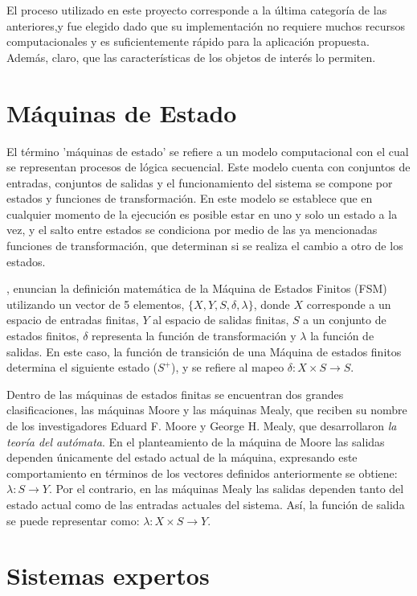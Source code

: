 El proceso utilizado en este proyecto corresponde a la última categoría de las anteriores,y fue elegido dado que su implementación no requiere muchos recursos computacionales y es suficientemente rápido para la aplicación propuesta. Además, claro, que las características de los objetos de interés lo permiten.


\section{Máquinas de Estado}

El término 'máquinas de estado' se refiere a un modelo computacional con el cual se representan procesos de lógica secuencial. Este modelo cuenta con conjuntos de entradas, conjuntos de salidas y el funcionamiento del sistema se compone por estados y funciones de transformación. En este modelo se establece que en cualquier momento de la ejecución es posible estar en uno y solo un estado a la vez, y el salto entre estados se condiciona por medio de las ya mencionadas funciones de transformación, que determinan si se realiza el cambio a otro de los estados.

\cite{czerwinski_definitions_2013}, enuncian la definición matemática de la Máquina de Estados Finitos (FSM) utilizando un vector de 5 elementos, $\{X,Y,S,\delta,\lambda\}$, donde $X$ corresponde a un espacio de entradas finitas, $Y$ al espacio de salidas finitas, $S$ a un conjunto de estados finitos, $\delta$ representa la función de transformación y $\lambda$ la función de salidas. En este caso, la función de transición de una Máquina de estados finitos determina el siguiente estado ($S^+$), y se refiere al mapeo $\delta: X \times S \to S $.


Dentro de las máquinas de estados finitas se encuentran dos grandes clasificaciones, las máquinas Moore y las máquinas Mealy, que reciben su nombre de los investigadores Eduard F. Moore y George H. Mealy, que desarrollaron \textit{la teoría del autómata}. En el planteamiento de la máquina de Moore las salidas dependen únicamente del estado actual de la máquina, expresando este comportamiento en términos de los vectores definidos anteriormente se obtiene: $\lambda: S \to Y$. Por el contrario, en las máquinas Mealy las salidas dependen tanto del estado actual como de las entradas actuales del sistema. Así, la función de salida se puede representar como: $\lambda: X \times S \to Y$.


\section{Sistemas expertos}
 

